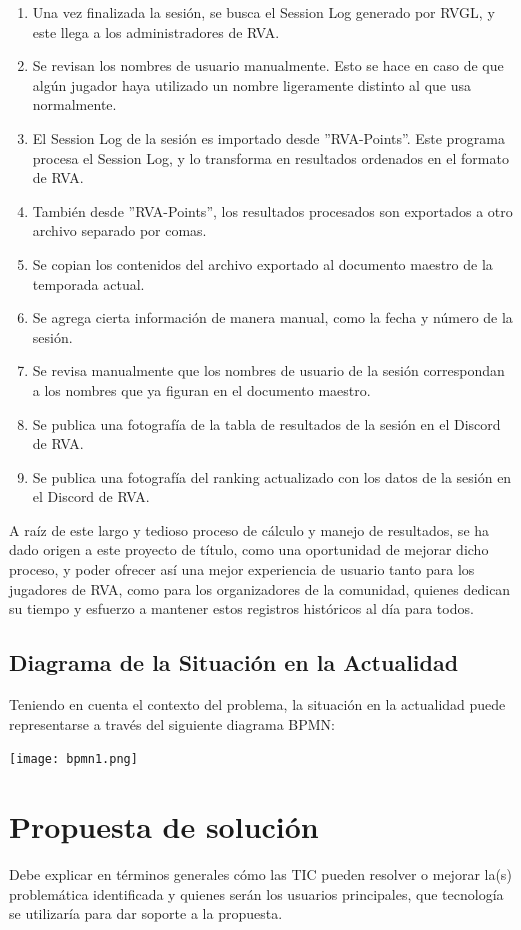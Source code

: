 \begin{enumerate}
	\item Una vez finalizada la sesión, se busca el Session Log generado por RVGL, y este llega a los administradores de RVA.
	\item Se revisan los nombres de usuario manualmente. Esto se hace en caso de que algún jugador haya utilizado un nombre ligeramente distinto al que usa normalmente.
	\item El Session Log de la sesión es importado desde ''RVA-Points''. Este programa procesa el Session Log, y lo transforma en resultados ordenados en el formato de RVA.
	\item También desde ''RVA-Points'', los resultados procesados son exportados a otro archivo separado por comas.
	\item Se copian los contenidos del archivo exportado al documento maestro de la temporada actual.
	\item Se agrega cierta información de manera manual, como la fecha y número de la sesión.
	\item Se revisa manualmente que los nombres de usuario de la sesión correspondan a los nombres que ya figuran en el documento maestro.
	\item Se publica una fotografía de la tabla de resultados de la sesión en el Discord de RVA.
	\item Se publica una fotografía del ranking actualizado con los datos de la sesión en el Discord de RVA.
\end{enumerate}

A raíz de este largo y tedioso proceso de cálculo y manejo de resultados, se ha dado origen a este proyecto de título, como una oportunidad de mejorar dicho proceso, y poder ofrecer así una mejor experiencia de usuario tanto para los jugadores de RVA, como para los organizadores de la comunidad, quienes dedican su tiempo y esfuerzo a mantener estos registros históricos al día para todos.

\subsection{Diagrama de la Situación en la Actualidad}
Teniendo en cuenta el contexto del problema, la situación en la actualidad puede representarse a través del siguiente diagrama BPMN:
\begin{center}
	\texttt{[image: bpmn1.png]}
\end{center}


\section{Propuesta de solución}
Debe explicar en términos generales cómo las TIC pueden resolver o mejorar la(s) problemática identificada y quienes serán los usuarios principales, que tecnología se utilizaría para dar soporte a la propuesta.


